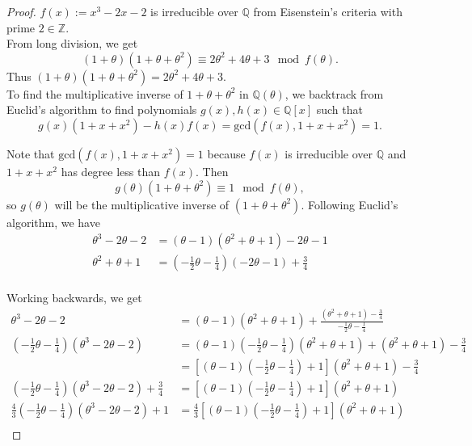 \documentclass{article}
\begin{document}
  \begin{proof}
    $f(x):=x^3-2x-2$ is irreducible over $\mathbb{Q}$ from Eisenstein's
    criteria with prime $2\in\mathbb{Z}$. \\

    From long division, we get
    \[(1+\theta)(1+\theta+\theta^2) \equiv 2\theta^2+4\theta+3
    \mod{f(\theta)}.\]
    Thus $(1+\theta)(1+\theta+\theta^2) =2\theta^2+4\theta+3$. \\

    To find the multiplicative inverse of $1+\theta+\theta^2$ in
    $\mathbb{Q}(\theta)$, we backtrack from Euclid's algorithm to find
    polynomials $g(x),h(x)\in\mathbb{Q}[x]$ such that
    \[g(x)(1+x+x^2) -h(x)f(x) =\text{gcd}(f(x),1+x+x^2)=1.\]

    Note that $\text{gcd}(f(x),1+x+x^2)=1$ because $f(x)$ is irreducible
    over $\mathbb{Q}$ and $1+x+x^2$ has degree less than $f(x)$. Then
    \[g(\theta)(1+\theta+\theta^2) \equiv 1 \mod{f(\theta)},\]
    so $g(\theta)$ will be the multiplicative inverse of
    $(1+\theta+\theta^2)$. Following Euclid's algorithm, we have
    \begin{align*}
      \theta^3-2\theta-2 &=(\theta-1)(\theta^2+\theta+1) -2\theta-1\\
      \theta^2+\theta+1 &=\left(-\frac{1}{2}\theta-\frac{1}{4}\right)
        (-2\theta-1) +\frac{3}{4}\\
    \end{align*}

    Working backwards, we get
    \begin{align*}
      \theta^3-2\theta-2 &=(\theta-1)(\theta^2+\theta+1)
        +\frac{(\theta^2+\theta+1)-\frac{3}{4}}
        {-\frac{1}{2}\theta-\frac{1}{4}}\\
      \left(-\frac{1}{2}\theta-\frac{1}{4}\right) (\theta^3-2\theta-2)
        &=(\theta-1) \left(-\frac{1}{2}\theta -\frac{1}{4}\right)
        (\theta^2+\theta+1) +(\theta^2+\theta+1)-\frac{3}{4}\\
      &=\left[(\theta-1) \left(-\frac{1}{2}\theta-\frac{1}{4}\right) +1
        \right] (\theta^2+\theta+1) -\frac{3}{4}\\
      \left(-\frac{1}{2}\theta-\frac{1}{4}\right) (\theta^3-2\theta-2)
        +\frac{3}{4}
        &=\left[(\theta-1) \left(-\frac{1}{2}\theta-\frac{1}{4}\right) +1
        \right] (\theta^2+\theta+1)\\
      \frac{4}{3} \left(-\frac{1}{2}\theta-\frac{1}{4}\right)
        (\theta^3-2\theta-2) +1
        &=\frac{4}{3} \left[(\theta-1)
        \left(-\frac{1}{2}\theta-\frac{1}{4}\right) +1 \right]
        (\theta^2+\theta+1)\\
    \end{align*}


\end{proof}
\end{document}
